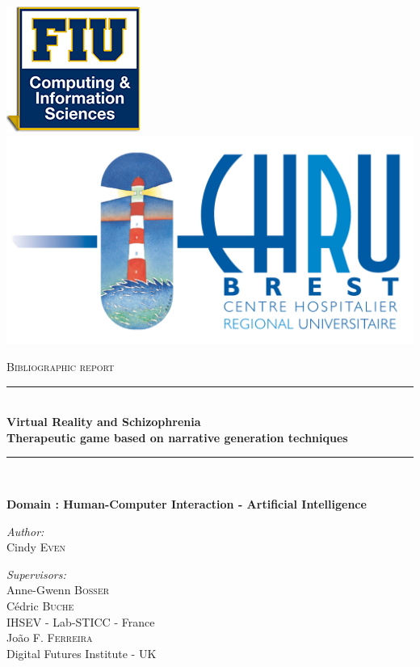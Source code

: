 \documentclass[11pt]{article}
\newcommand{\HRule}{\rule{\linewidth}{0.5mm}}
\begin{document}
\begin{titlepage}
\begin{center}
\includegraphics[height=0.1\textheight]{./logos/fiu}
\includegraphics[height=0.1\textheight]{./logos/CHRU_Brest}


  
\vspace{1cm} 
\textsc{\Large Bibliographic report }\\[0.5cm]


\HRule \\[0.4cm]
{ \Large \bfseries Virtual Reality and Schizophrenia }\\[0.4cm]
{ \bfseries Therapeutic game based on  narrative generation techniques }\\[0.2cm]
\HRule \\[1.5cm]
\begin{flushleft}
\textbf{Domain : Human-Computer Interaction - Artificial Intelligence \\[1cm]}
\end{flushleft}


\begin{minipage}{0.4\textwidth}
\begin{flushleft} \large
\emph{Author:}\\
Cindy  \textsc{Even}
\end{flushleft}
\end{minipage}
\begin{minipage}{0.4\textwidth}
\begin{flushright} \large
\emph{Supervisors:} \\[2ex]
%
Anne-Gwenn \textsc{Bosser } \\
C\'{e}dric \textsc{Buche } \\
IHSEV - Lab-STICC - France\\[2ex]
Jo\~{a}o \textsc{F. Ferreira } \\
Digital Futures Institute - UK
\end{flushright}
\end{minipage}


\end{center}
\end{titlepage}
\end{document}
